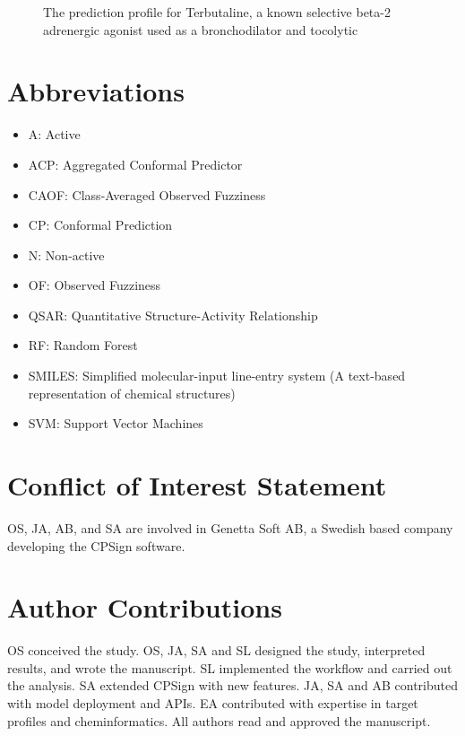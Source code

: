 \documentclass[10pt,article]{memoir}
\newenvironment{wideMinipage}
{ \vskip 1\baselineskip
  \noindent   
  \checkoddpage%
  \ifoddpage%
     \hspace*{-3em}%
  \else%
     \hspace*{-3em}%
  \fi%
  \begin{minipage}{1\textwidth + 6em}
}
{ 
    \end{minipage}
    \vskip 1\baselineskip
}
\begin{document}
\begin{figure}
\begin{wideMinipage}
\begin{minipage}{0.19\textwidth}
    \end{minipage}
    \caption{The prediction profile for Terbutaline, a known selective beta-2 adrenergic agonist  used as a broncho\-dilator and tocolytic \label{fig:web}}
\end{wideMinipage}
\end{figure}

\FloatBarrier

\section*{Abbreviations}

\begin{itemize}
    \item A: Active
    \item ACP: Aggregated Conformal Predictor
    \item CAOF: Class-Averaged Observed Fuzziness
    \item CP: Conformal Prediction
    \item N: Non-active
    \item OF: Observed Fuzziness
    \item QSAR: Quantitative Structure-Activity Relationship
    \item RF: Random Forest
    \item SMILES: Simplified molecular-input line-entry system (A text-based representation of chemical structures)
    \item SVM: Support Vector Machines
\end{itemize}

\section*{Conflict of Interest Statement}
OS, JA, AB, and SA are involved in Genetta Soft AB, a Swedish based company
developing the CPSign software.


\section*{Author Contributions}
OS conceived the study. OS, JA, SA and SL designed the study, interpreted
results, and wrote the manuscript. SL implemented the workflow and carried out
the analysis. SA extended CPSign with new features. JA, SA and AB contributed
with model deployment and APIs. EA contributed with expertise in target
profiles and cheminformatics. All authors read and approved the manuscript.
\end{document}
